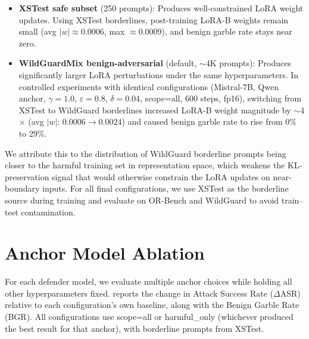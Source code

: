 \begin{itemize}[nosep,leftmargin=*]
    \item \textbf{XSTest safe subset} (250 prompts): Produces well-constrained LoRA weight updates. Using XSTest borderlines, post-training LoRA-B weights remain small (avg $|w| \approx 0.0006$, max $\approx 0.0009$), and benign garble rate stays near zero.
    \item \textbf{WildGuardMix benign-adversarial} (default, $\sim$4K prompts): Produces significantly larger LoRA perturbations under the same hyperparameters. In controlled experiments with identical configurations (Mistral-7B, Qwen anchor, $\gamma{=}1.0$, $\varepsilon{=}0.8$, $\delta{=}0.04$, scope=all, 600 steps, fp16), switching from XSTest to WildGuard borderlines increased LoRA-B weight magnitude by $\sim$4$\times$ (avg $|w|$: $0.0006 \to 0.0024$) and caused benign garble rate to rise from 0\% to 29\%.
\end{itemize}

\noindent We attribute this to the distribution of WildGuard borderline prompts being closer to the harmful training set in representation space, which weakens the KL-preservation signal that would otherwise constrain the LoRA updates on near-boundary inputs. For all final configurations, we use XSTest as the borderline source during training and evaluate on OR-Bench and WildGuard to avoid train--test contamination.

\section{Anchor Model Ablation}
\label{app:anchor_ablation}

For each defender model, we evaluate multiple anchor choices while holding all other hyperparameters fixed.  reports the change in Attack Success Rate ($\Delta$ASR) relative to each configuration's own baseline, along with the Benign Garble Rate (BGR). All configurations use scope=all or harmful\_only (whichever produced the best result for that anchor), with borderline prompts from XSTest.

